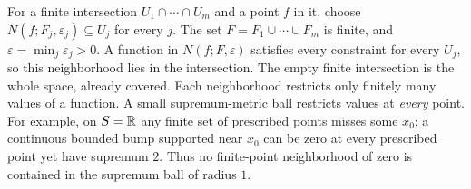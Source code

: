 For a finite intersection $U_1\cap\cdots\cap U_m$ and a point $f$ in
it, choose $N(f;F_j,\varepsilon_j)\subseteq U_j$ for every $j$.
The set $F=F_1\cup\cdots\cup F_m$ is finite, and
$\varepsilon=\min_j\varepsilon_j>0$. A function in
$N(f;F,\varepsilon)$ satisfies every constraint for every $U_j$,
so this neighborhood lies in the intersection. The empty finite
intersection is the whole space, already covered.
Each neighborhood restricts only finitely many values of a function.
A small supremum-metric ball restricts values at \emph{every} point.
For example, on $S=\mathbb{R}$ any finite set of prescribed points misses
some $x_0$; a continuous bounded bump supported near $x_0$ can be zero
at every prescribed point yet have supremum $2$. Thus no finite-point
neighborhood of zero is contained in the supremum ball of radius $1$.

